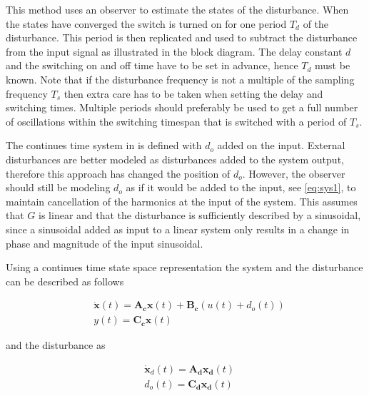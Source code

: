 This method uses an observer to estimate the states of the disturbance. When the states have converged the switch is turned on for one period $T_d$ of the disturbance. This period is then replicated and used to subtract the disturbance from the input signal as illustrated in the block diagram. The delay constant $d$ and the switching on and off time have to be set in advance, hence $T_d$ must be known. Note that if the disturbance frequency is not a multiple of the sampling frequency $T_s$ then extra care has to be taken when setting the delay and switching times. Multiple periods should preferably be used to get a full number of oscillations within the switching timespan that is switched with a period of $T_s$.

The continues time system in \citep{fujimoto2004repetitive} is defined with $d_o$ added on the input. External disturbances are better modeled as disturbances added to the system output, therefore this approach has changed the position of $d_o$. However, the observer should still be modeling $d_o$ as if it would be added to the input, see \eqref{eq:sys1}, to maintain cancellation of the harmonics at the input of the system. This assumes that $G$ is linear and that the disturbance is sufficiently described by a sinusoidal, since a sinusoidal added as input to a linear system only results in a change in phase and magnitude of the input sinusoidal.

Using a continues time state space representation the system and the disturbance can be described as follows

\begin{subequations}
  \label{eq:sys12}
  \begin{alignat}{2}
    \label{eq:sys1}
    & \mathbf{\dot{x}}(t) = \mathbf{A_cx}(t) + \mathbf{B_c}(u(t) + d_o(t)) \\
    \label{eq:sys2}
    & y(t) = \mathbf{C_cx}(t)
  \end{alignat}
\end{subequations}

and the disturbance as

\begin{subequations}
  \label{eq:dist12}
  \begin{alignat}{2}
    \label{eq:dist1}
    & \mathbf{\dot{x}}_d(t) = \mathbf{A_dx_d}(t) \\
    \label{eq:dist2}
    & d_o(t) = \mathbf{C_dx_d}(t)
  \end{alignat}
\end{subequations}

